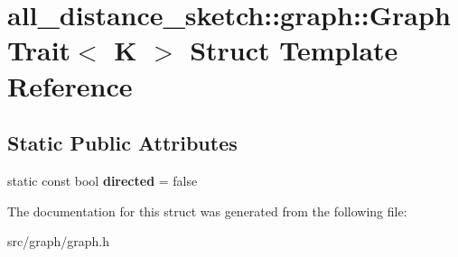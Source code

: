 \hypertarget{structall__distance__sketch_1_1graph_1_1GraphTrait}{}\section{all\+\_\+distance\+\_\+sketch\+:\+:graph\+:\+:Graph\+Trait$<$ K $>$ Struct Template Reference}
\label{structall__distance__sketch_1_1graph_1_1GraphTrait}
\subsection*{Static Public Attributes}
\begin{DoxyCompactItemize}
\item 
\hypertarget{structall__distance__sketch_1_1graph_1_1GraphTrait_af2a9193efeb405cf7ebc936e7173fdf5}{}static const bool {\bfseries directed} = false\label{structall__distance__sketch_1_1graph_1_1GraphTrait_af2a9193efeb405cf7ebc936e7173fdf5}

\end{DoxyCompactItemize}


The documentation for this struct was generated from the following file\+:\begin{DoxyCompactItemize}
\item 
src/graph/graph.\+h\end{DoxyCompactItemize}
